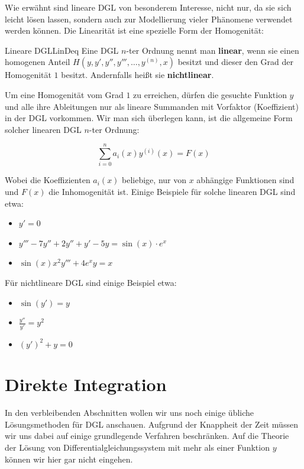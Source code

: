 Wie erwähnt sind lineare DGL von besonderem Interesse, nicht nur, da sie sich leicht lösen lassen, sondern auch zur Modellierung vieler Phänomene verwendet werden können. Die Linearität ist eine spezielle Form der Homogenität:

\begin{definition}{Lineare DGL}{LinDeq}
    Eine DGL $n$-ter Ordnung nennt man \textbf{linear}, wenn sie einen homogenen Anteil $H(y,y',y'',y''',\dots,y^{(n)},x)$ besitzt und dieser den Grad der Homogenität $1$ besitzt. Andernfalls heißt sie \textbf{nichtlinear}.
\end{definition}

Um eine Homogenität vom Grad $1$ zu erreichen, dürfen die gesuchte Funktion $y$ und alle ihre Ableitungen nur als lineare Summanden mit Vorfaktor (Koeffizient) in der DGL vorkommen. Wir man sich überlegen kann, ist die allgemeine Form solcher linearen DGL $n$-ter Ordnung:

$$
    \sum\limits_{i=0}^{n} a_i(x) y^{(i)}(x) = F(x)
$$

Wobei die Koeffizienten $a_i(x)$ beliebige, nur von $x$ abhängige Funktionen sind und $F(x)$ die Inhomogenität ist. Einige Beispiele für solche linearen DGL sind etwa:

\begin{itemize}
    \item $y'=0$
    \item $y'''-7y''+2y''+y'-5y=\sin(x)\cdot e^x$
    \item $\sin(x)x^2y'''+4e^x y = x$
\end{itemize}

Für nichtlineare DGL sind einige Beispiel etwa:

\begin{itemize}
    \item $\sin(y')=y$
    \item $\frac{y''}{y'} = y^2$
    \item $(y')^2+y=0$
\end{itemize}

\section{Direkte Integration}

In den verbleibenden Abschnitten wollen wir uns noch einige übliche Lösungsmethoden für DGL anschauen. Aufgrund der Knappheit der Zeit müssen wir uns dabei auf einige grundlegende Verfahren beschränken. Auf die Theorie der Lösung von Differentialgleichungssystem mit mehr als einer Funktion $y$ können wir hier gar nicht eingehen.


